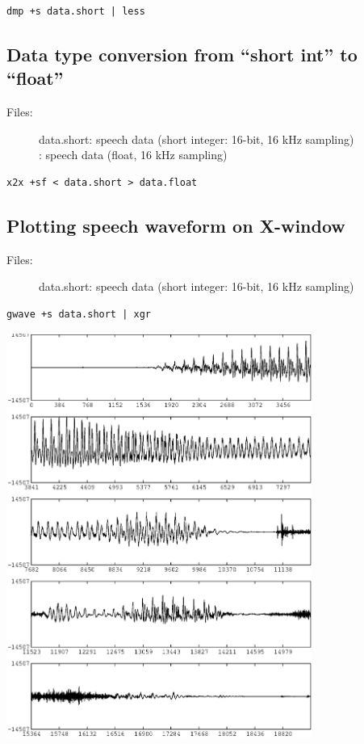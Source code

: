 \documentclass[a4paper]{article}
\begin{document}
\begin{verbatim}
dmp +s data.short | less
\end{verbatim}

\subsection{Data type conversion from ``short int'' to ``float''}

\begin{description}
\item[Files:]
  data.short: speech data (short integer: 16-bit, 16 kHz sampling)\\
  : 
  speech data (float, 16 kHz sampling)\\
\end{description}

\begin{verbatim}
x2x +sf < data.short > data.float
\end{verbatim}

\subsection{Plotting speech waveform on X-window}

\begin{description}
\item[Files:]
  data.short: speech data (short integer: 16-bit, 16 kHz sampling)
\end{description}

\begin{verbatim}
gwave +s data.short | xgr
\end{verbatim}

\includegraphics[width=10cm]{data.gwave.eps}
\end{document}
